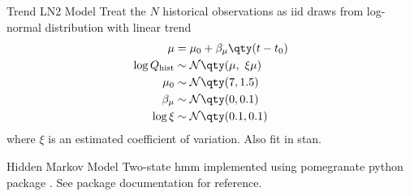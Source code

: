 \documentclass[
  10pt,     %
]{beamer}
\newcommand{\normal}{\mathcal{N}}
\begin{document}
\begin{frame}{Trend LN2 Model}
  Treat the $N$ historical observations as \gls{iid} draws from log-normal distribution with linear trend
  \begin{align}\label{eq:ln2-trend}
    \begin{split}
      \mu &= \mu_0 + \beta_\mu \qty(t - t_0) \\
    \log Q_\text{hist} & \sim \normal \qty(\mu, \ \xi \mu) \\
    \mu_0 & \sim \normal \qty(7, 1.5) \\
    \beta_\mu & \sim \normal \qty(0, 0.1) \\
    \log \xi & \sim \normal \qty(0.1, 0.1)
    \end{split}
  \end{align}
  where $\xi$ is an estimated coefficient of variation.
  Also fit in stan.
\end{frame}

\begin{frame}{Hidden Markov Model}
  Two-state \gls{hmm} \citep[see][]{Rabiner:1986jk} implemented using pomegranate python package \citep{Schreiber:2017tg}.
  See package documentation for reference.
\end{frame}
\end{document}
